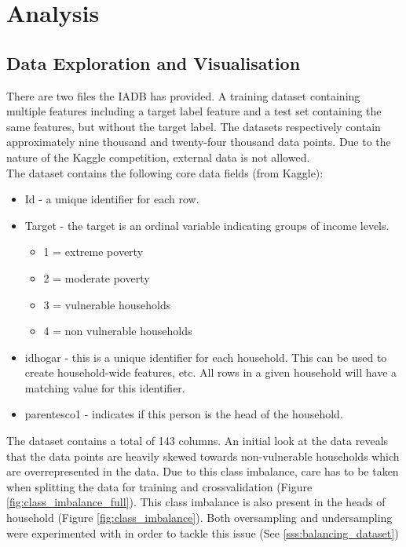 \documentclass[preprint,12pt]{elsarticle}
\begin{document}
\section{Analysis}
\label{S:2}

\subsection{Data Exploration and Visualisation}
There are two files the IADB has provided. A training dataset containing multiple features including a target label feature and a test set containing the same features, but without the target label. The datasets respectively contain approximately nine thousand and twenty-four thousand data points. Due to the nature of the Kaggle competition, external data is not allowed.\\
The dataset contains the following core data fields (from Kaggle):
\begin{itemize}
\item Id - a unique identifier for each row.
\item Target - the target is an ordinal variable indicating groups of income levels.
\begin{itemize}
\item 1 = extreme poverty
\item 2 = moderate poverty
\item 3 = vulnerable households
\item 4 = non vulnerable households
\end{itemize}
\item idhogar - this is a unique identifier for each household. This can be used to create household-wide features, etc. All rows in
a given household will have a matching value for this identifier.
\item parentesco1 - indicates if this person is the head of the household.
\end{itemize}
The dataset contains a total of 143 columns.
An initial look at the data reveals that the data points are heavily skewed towards non-vulnerable households which are overrepresented in the data. Due to this class imbalance, care has to be taken when splitting the data for training and crossvalidation (Figure \ref{fig:class_imbalance_full}). This class imbalance is also present in the heads of household (Figure \ref{fig:class_imbalance}). Both oversampling and undersampling were experimented with in order to tackle this issue (See \ref{sss:balancing_dataset})
\end{document}
